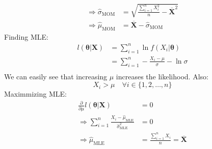 \documentclass[11pt]{article}
\newcommand{\mean}[1]{\boldsymbol{\overline{#1}}}
\newcommand{\mom}[1]{\hat{#1}_{\text{MOM}}}
\newcommand{\mle}[1]{\hat{#1}_{\text{MLE}}}
\begin{document}
\begin{enumerate}
\begin{enumerate}
\begin{align*}
        \Rightarrow \mom{\sigma} &= \sqrt{\frac{\sum_{i = 1}^{n} X_i^2}{n} - \mean{X}^2} \\
        \Rightarrow \mom{\mu} &= \mean{X} - \mom{\sigma}
      \end{align*}
      Finding MLE:
      \begin{align*}
        l(\boldsymbol{\theta} | \boldsymbol{X}) &= \sum_{i = 1}^{n} \ln f(X_i | \boldsymbol{\theta}) \\
        &= \sum_{i = 1}^{n} -\frac{X_i - \mu}{\sigma} - \ln \sigma \\
      \end{align*}
      We can easily see that increasing $\mu$ increases the likelihood.
      Also:
      \[X_i > \mu \quad \forall i \in \{1, 2, \dots, n\}\]
      Maximmizing MLE:
      \begin{align*}
        \frac{\partial}{\partial \mu} l(\boldsymbol{\theta} | \boldsymbol{X}) &= 0 \\
        \Rightarrow \sum_{i = 1}^{n} \frac{X_i - \mle{\mu}}{\mle{\sigma}^2} &= 0 \\
        \Rightarrow \mle{\mu} &= \frac{\sum_{i = 1}^{n} X_i}{n} = \mean{X}
      \end{align*}
    \end{enumerate}

  \end{enumerate}
\end{document}
